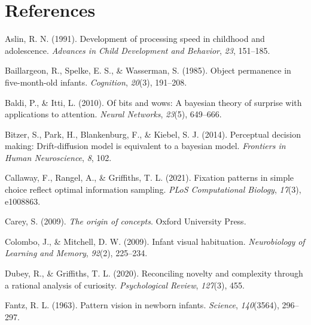 \documentclass[
  man,floatsintext]{apa6}
\newlength{\cslhangindent}
\newlength{\cslentryspacingunit} %
\newenvironment{CSLReferences}[2] %
 {%
  \setlength{\parindent}{0pt}
  \ifodd #1
  \let\oldpar\par
  \def\par{\hangindent=\cslhangindent\oldpar}
  \fi
  \setlength{\parskip}{#2\cslentryspacingunit}
 }%
 {}
\begin{document}
\hypertarget{references}{%
\section{References}\label{references}}

\hypertarget{refs}{}
\begin{CSLReferences}{1}{0}
\leavevmode{}%
Aslin, R. N. (1991). Development of processing speed in childhood and adolescence. \emph{Advances in Child Development and Behavior}, \emph{23}, 151--185.

\leavevmode{}%
Baillargeon, R., Spelke, E. S., \& Wasserman, S. (1985). Object permanence in five-month-old infants. \emph{Cognition}, \emph{20}(3), 191--208.

\leavevmode{}%
Baldi, P., \& Itti, L. (2010). Of bits and wows: A bayesian theory of surprise with applications to attention. \emph{Neural Networks}, \emph{23}(5), 649--666.

\leavevmode{}%
Bitzer, S., Park, H., Blankenburg, F., \& Kiebel, S. J. (2014). Perceptual decision making: Drift-diffusion model is equivalent to a bayesian model. \emph{Frontiers in Human Neuroscience}, \emph{8}, 102.

\leavevmode{}%
Callaway, F., Rangel, A., \& Griffiths, T. L. (2021). Fixation patterns in simple choice reflect optimal information sampling. \emph{PLoS Computational Biology}, \emph{17}(3), e1008863.

\leavevmode{}%
Carey, S. (2009). \emph{The origin of concepts}. Oxford University Press.

\leavevmode{}%
Colombo, J., \& Mitchell, D. W. (2009). Infant visual habituation. \emph{Neurobiology of Learning and Memory}, \emph{92}(2), 225--234.

\leavevmode{}%
Dubey, R., \& Griffiths, T. L. (2020). Reconciling novelty and complexity through a rational analysis of curiosity. \emph{Psychological Review}, \emph{127}(3), 455.

\leavevmode{}%
Fantz, R. L. (1963). Pattern vision in newborn infants. \emph{Science}, \emph{140}(3564), 296--297.


\end{CSLReferences}
\end{document}
